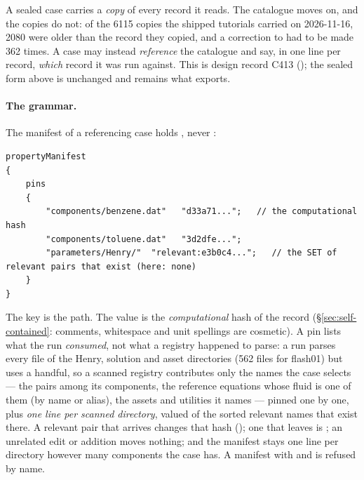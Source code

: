\documentclass[11pt,a4paper]{article}
\begin{document}
A sealed case carries a \emph{copy} of every record it reads.  The catalogue
moves on, and the copies do not: of the 6115 copies the shipped tutorials
carried on 2026-11-16, 2080 were older than the record they copied, and a
correction to  had to be made 362 times.  A case may instead
\emph{reference} the catalogue and say, in one line per record, \emph{which}
record it was run against.  This is design record C413
(); the sealed form
above is unchanged and remains what  exports.

\paragraph{The grammar.}
The manifest of a referencing case holds , never :
\begin{lstlisting}
propertyManifest
{
    pins
    {
        "components/benzene.dat"   "d33a71...";   // the computational hash
        "components/toluene.dat"   "3d2dfe...";
        "parameters/Henry/"  "relevant:e3b0c4...";   // the SET of relevant pairs that exist (here: none)
    }
}
\end{lstlisting}
The key is the  path.  The value is the
\emph{computational} hash of the record (\S\ref{sec:self-contained}: comments,
whitespace and unit spellings are cosmetic).  A pin lists what the run
\emph{consumed}, not what a registry happened to parse: a run parses every file
of the Henry, solution and asset directories (562 files for flash01) but uses a
handful, so a scanned registry contributes only the names the case selects ---
the pairs among its components, the reference equations whose fluid is one of them (by name or alias),
the assets and utilities it names --- pinned one
by one, plus \emph{one line per scanned directory}, valued
 of the sorted relevant names that exist there.  A relevant
pair that arrives changes that hash (); one that leaves is
; an unrelated edit or addition moves nothing; and the manifest
stays one line per directory however many components the case has.  A manifest with  and
 is refused by name.
\end{document}
